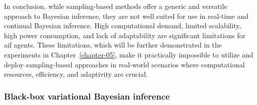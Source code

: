 In conclusion, while sampling-based methods offer a generic and versatile approach to Bayesian inference, they are not well suited for use in real-time and continual Bayesian inference. High computational demand, limited scalability, high power consumption, and lack of adaptability are significant limitations for \ac{aif} agents. These limitations, which will be further demonstrated in the experiments in Chapter~\ref{chapter-05}, make it practically impossible to utilize and deploy sampling-based approaches in real-world scenarios where computational resources, efficiency, and adaptivity are crucial. 

\subsubsection{Black-box variational Bayesian inference}


